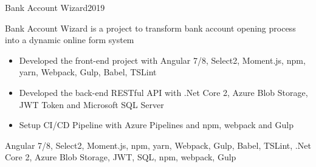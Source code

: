 %
%
%


\begin{projects}
	\project
	{Bank Account Wizard}{2019}
	{  }
	{
	Bank Account Wizard is a project to transform bank account opening process into a dynamic online form system
	\begin{itemize}
        \item Developed the front-end project with Angular 7/8, Select2, Moment.js, npm, yarn, Webpack, Gulp, Babel, TSLint
        \item Developed the back-end RESTful API with .Net Core 2, Azure Blob Storage, JWT Token and Microsoft SQL Server
        \item Setup CI/CD Pipeline with Azure Pipelines and npm, webpack and Gulp

    \end{itemize}
    }
    {Angular 7/8, Select2, Moment.js, npm, yarn, Webpack, Gulp, Babel, TSLint, .Net Core 2, Azure Blob Storage, JWT, SQL, npm, webpack, Gulp}
    
\end{projects}